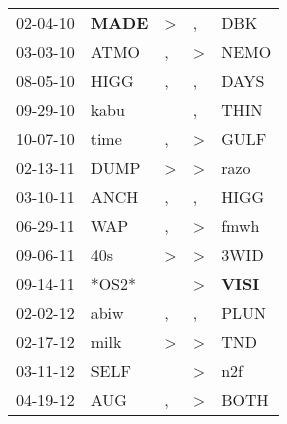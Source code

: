 \begin{supertabular}{p{0.07\textwidth}p{0.06\textwidth}p{0.02\textwidth}p{0.02\textwidth}p{0.06\textwidth}}
          02-04-10\textsuperscript{} &  \textbf{MADE\textsuperscript{}} &     \textgreater &                , &            DBK\textsuperscript{} \\
          03-03-10\textsuperscript{} &           ATMO\textsuperscript{} &                , &     \textgreater &           NEMO\textsuperscript{} \\
          08-05-10\textsuperscript{} &           HIGG\textsuperscript{} &                , &                , &           DAYS\textsuperscript{} \\
          09-29-10\textsuperscript{} &           kabu\textsuperscript{} &                  &                , &           THIN\textsuperscript{} \\
          10-07-10\textsuperscript{} &           time\textsuperscript{} &                , &     \textgreater &           GULF\textsuperscript{} \\
          02-13-11\textsuperscript{} &           DUMP\textsuperscript{} &     \textgreater &     \textgreater &           razo\textsuperscript{} \\
          03-10-11\textsuperscript{} &           ANCH\textsuperscript{} &                , &                , &           HIGG\textsuperscript{} \\
          06-29-11\textsuperscript{} &            WAP\textsuperscript{} &                , &     \textgreater &           fmwh\textsuperscript{} \\
          09-06-11\textsuperscript{} &            40s\textsuperscript{} &     \textgreater &     \textgreater &           3WID\textsuperscript{} \\
          09-14-11\textsuperscript{} &                            *OS2* &                  &     \textgreater &  \textbf{VISI\textsuperscript{}} \\
          02-02-12\textsuperscript{} &           abiw\textsuperscript{} &                , &                , &           PLUN\textsuperscript{} \\
          02-17-12\textsuperscript{} &           milk\textsuperscript{} &     \textgreater &     \textgreater &            TND\textsuperscript{} \\
          03-11-12\textsuperscript{} &           SELF\textsuperscript{} &                  &     \textgreater &            n2f\textsuperscript{} \\
          04-19-12\textsuperscript{} &            AUG\textsuperscript{} &                , &     \textgreater &           BOTH\textsuperscript{} \\

\end{supertabular}
